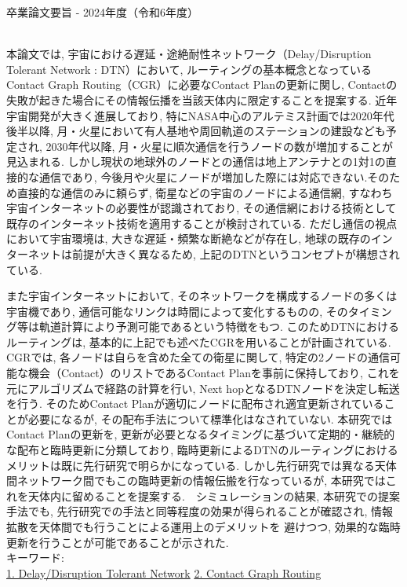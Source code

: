 卒業論文要旨 - 2024年度（令和6年度）
\begin{center}
\begin{large}
\end{large}
\end{center}

~ \\
本論文では, 宇宙における遅延・途絶耐性ネットワーク（Delay/Disruption Tolerant Network : DTN）において, 
ルーティングの基本概念となっているContact Graph Routing（CGR）に必要なContact Planの更新に関し, 
Contactの失敗が起きた場合にその情報伝播を当該天体内に限定することを提案する.
近年宇宙開発が大きく進展しており, 特にNASA中心のアルテミス計画では2020年代後半以降, 
月・火星において有人基地や周回軌道のステーションの建設なども予定され, 
2030年代以降, 月・火星に順次通信を行うノードの数が増加することが見込まれる.
しかし現状の地球外のノードとの通信は地上アンテナとの1対1の直接的な通信であり, 
今後月や火星にノードが増加した際には対応できない.そのため直接的な通信のみに頼らず, 
衛星などの宇宙のノードによる通信網, すなわち宇宙インターネットの必要性が認識されており, 
その通信網における技術として既存のインターネット技術を適用することが検討されている.
ただし通信の視点において宇宙環境は, 大きな遅延・頻繁な断絶などが存在し, 
地球の既存のインターネットは前提が大きく異なるため, 
上記のDTNというコンセプトが構想されている.

また宇宙インターネットにおいて, そのネットワークを構成するノードの多くは宇宙機であり, 
通信可能なリンクは時間によって変化するものの, そのタイミング等は軌道計算により予測可能であるという特徴をもつ.
このためDTNにおけるルーティングは, 基本的に上記でも述べたCGRを用いることが計画されている.
CGRでは, 各ノードは自らを含めた全ての衛星に関して, 
特定の2ノードの通信可能な機会（Contact）のリストであるContact Planを事前に保持しており, 
これを元にアルゴリズムで経路の計算を行い, Next hopとなるDTNノードを決定し転送を行う.
そのためContact Planが適切にノードに配布され適宜更新されていることが必要になるが, 
その配布手法について標準化はなされていない. 本研究ではContact Planの更新を, 
更新が必要となるタイミングに基づいて定期的・継続的な配布と臨時更新に分類しており, 
臨時更新によるDTNのルーティングにおけるメリットは既に先行研究で明らかになっている.
しかし先行研究では異なる天体間ネットワーク間でもこの臨時更新の情報伝搬を行なっているが, 
本研究ではこれを天体内に留めることを提案する.　シミュレーションの結果, 本研究での提案手法でも, 
先行研究での手法と同等程度の効果が得られることが確認され, 情報拡散を天体間でも行うことによる運用上のデメリットを
避けつつ, 効果的な臨時更新を行うことが可能であることが示された.
~ \\


キーワード:\\
\underline{1. Delay/Disruption Tolerant Network} 
\underline{2. Contact Graph Routing} 
\begin{flushright}
\dept \\
\author
\end{flushright}
